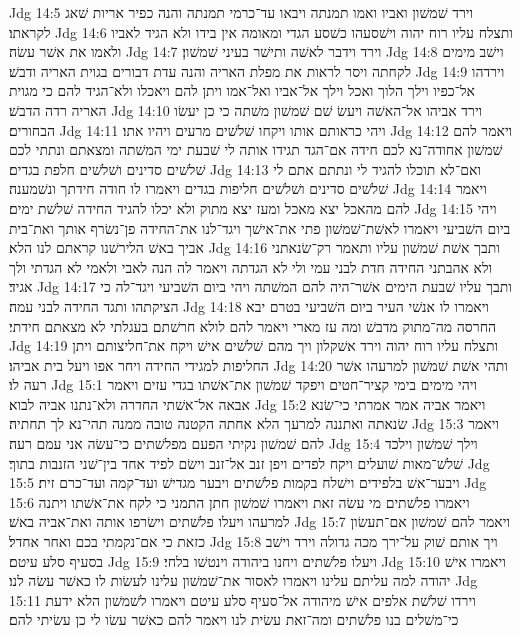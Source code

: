 Jdg 14:5  וירד שׁמשׁון ואביו ואמו תמנתה ויבאו עד־כרמי תמנתה והנה כפיר אריות שׁאג לקראתו׃
Jdg 14:6  ותצלח עליו רוח יהוה וישׁסעהו כשׁסע הגדי ומאומה אין בידו ולא הגיד לאביו ולאמו את אשׁר עשׂה׃
Jdg 14:7  וירד וידבר לאשׁה ותישׁר בעיני שׁמשׁון׃
Jdg 14:8  וישׁב מימים לקחתה ויסר לראות את מפלת האריה והנה עדת דבורים בגוית האריה ודבשׁ׃
Jdg 14:9  וירדהו אל־כפיו וילך הלוך ואכל וילך אל־אביו ואל־אמו ויתן להם ויאכלו ולא־הגיד להם כי מגוית האריה רדה הדבשׁ׃
Jdg 14:10  וירד אביהו אל־האשׁה ויעשׂ שׁם שׁמשׁון משׁתה כי כן יעשׂו הבחורים׃
Jdg 14:11  ויהי כראותם אותו ויקחו שׁלשׁים מרעים ויהיו אתו׃
Jdg 14:12  ויאמר להם שׁמשׁון אחודה־נא לכם חידה אם־הגד תגידו אותה לי שׁבעת ימי המשׁתה ומצאתם ונתתי לכם שׁלשׁים סדינים ושׁלשׁים חלפת בגדים׃
Jdg 14:13  ואם־לא תוכלו להגיד לי ונתתם אתם לי שׁלשׁים סדינים ושׁלשׁים חליפות בגדים ויאמרו לו חודה חידתך ונשׁמענה׃
Jdg 14:14  ויאמר להם מהאכל יצא מאכל ומעז יצא מתוק ולא יכלו להגיד החידה שׁלשׁת ימים׃
Jdg 14:15  ויהי ביום השׁביעי ויאמרו לאשׁת־שׁמשׁון פתי את־אישׁך ויגד־לנו את־החידה פן־נשׂרף אותך ואת־בית אביך באשׁ הלירשׁנו קראתם לנו הלא׃
Jdg 14:16  ותבך אשׁת שׁמשׁון עליו ותאמר רק־שׂנאתני ולא אהבתני החידה חדת לבני עמי ולי לא הגדתה ויאמר לה הנה לאבי ולאמי לא הגדתי ולך אגיד׃
Jdg 14:17  ותבך עליו שׁבעת הימים אשׁר־היה להם המשׁתה ויהי ביום השׁביעי ויגד־לה כי הציקתהו ותגד החידה לבני עמה׃
Jdg 14:18  ויאמרו לו אנשׁי העיר ביום השׁביעי בטרם יבא החרסה מה־מתוק מדבשׁ ומה עז מארי ויאמר להם לולא חרשׁתם בעגלתי לא מצאתם חידתי׃
Jdg 14:19  ותצלח עליו רוח יהוה וירד אשׁקלון ויך מהם שׁלשׁים אישׁ ויקח את־חליצותם ויתן החליפות למגידי החידה ויחר אפו ויעל בית אביהו׃
Jdg 14:20  ותהי אשׁת שׁמשׁון למרעהו אשׁר רעה לו׃
Jdg 15:1  ויהי מימים בימי קציר־חטים ויפקד שׁמשׁון את־אשׁתו בגדי עזים ויאמר אבאה אל־אשׁתי החדרה ולא־נתנו אביה לבוא׃
Jdg 15:2  ויאמר אביה אמר אמרתי כי־שׂנא שׂנאתה ואתננה למרעך הלא אחתה הקטנה טובה ממנה תהי־נא לך תחתיה׃
Jdg 15:3  ויאמר להם שׁמשׁון נקיתי הפעם מפלשׁתים כי־עשׂה אני עמם רעה׃
Jdg 15:4  וילך שׁמשׁון וילכד שׁלשׁ־מאות שׁועלים ויקח לפדים ויפן זנב אל־זנב וישׂם לפיד אחד בין־שׁני הזנבות בתוך׃
Jdg 15:5  ויבער־אשׁ בלפידים וישׁלח בקמות פלשׁתים ויבער מגדישׁ ועד־קמה ועד־כרם זית׃
Jdg 15:6  ויאמרו פלשׁתים מי עשׂה זאת ויאמרו שׁמשׁון חתן התמני כי לקח את־אשׁתו ויתנה למרעהו ויעלו פלשׁתים וישׂרפו אותה ואת־אביה באשׁ׃
Jdg 15:7  ויאמר להם שׁמשׁון אם־תעשׂון כזאת כי אם־נקמתי בכם ואחר אחדל׃
Jdg 15:8  ויך אותם שׁוק על־ירך מכה גדולה וירד וישׁב בסעיף סלע עיטם׃
Jdg 15:9  ויעלו פלשׁתים ויחנו ביהודה וינטשׁו בלחי׃
Jdg 15:10  ויאמרו אישׁ יהודה למה עליתם עלינו ויאמרו לאסור את־שׁמשׁון עלינו לעשׂות לו כאשׁר עשׂה לנו׃
Jdg 15:11  וירדו שׁלשׁת אלפים אישׁ מיהודה אל־סעיף סלע עיטם ויאמרו לשׁמשׁון הלא ידעת כי־משׁלים בנו פלשׁתים ומה־זאת עשׂית לנו ויאמר להם כאשׁר עשׂו לי כן עשׂיתי להם׃
